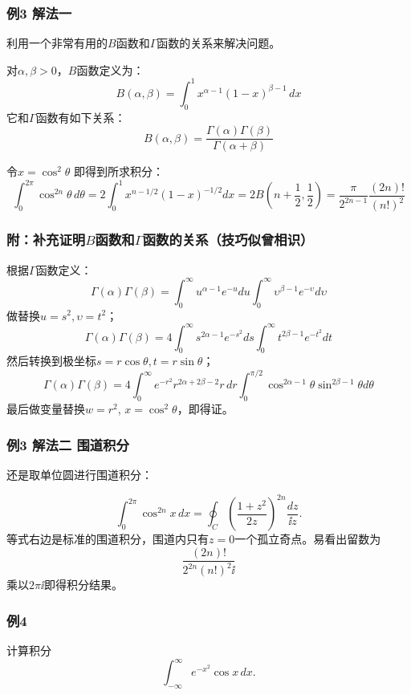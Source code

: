 \documentclass[CJK]{beamer}
\begin{document}
\begin{frame}
  \frametitle{例3 解法一}
  
  利用一个非常有用的{\blue $B$函数和$\Gamma$函数的关系}来解决问题。

  \skipline
  
  对$\alpha, \beta>0$，$B$函数定义为：
  $$B(\alpha,\beta) = \int_0^1 x^{\alpha-1}(1-x)^{\beta-1}\, dx$$
  它和$\Gamma$函数有如下关系：
  {\blue $$B(\alpha,\beta) = \frac{\Gamma(\alpha)\Gamma(\beta)}{\Gamma(\alpha+\beta)} $$}

  令$x=\cos^2\theta$ 即得到所求积分：
 {\small $$\int_0^{2\pi}\cos^{2n}\theta \,d\theta = 2 \int_0^1x^{n-1/2}(1-x)^{-1/2} dx =2 B(n+\frac{1}{2},\frac{1}{2}) = \frac{\pi}{2^{2n-1}}\frac{(2n)!}{(n!)^2} $$}
  
  
\end{frame}


\begin{frame}
  \frametitle{附：补充证明$B$函数和$\Gamma$函数的关系（技巧似曾相识）}
  
  根据$\Gamma$函数定义：
  $$  \Gamma(\alpha)\Gamma(\beta) = \int_0^\infty u^{\alpha-1}e^{-u} du \int_0^\infty \upsilon^{\beta-1}e^{-\upsilon} d\upsilon    $$
  做替换$u=s^2, \upsilon = t^2$；
  $$  \Gamma(\alpha)\Gamma(\beta) = 4 \int_0^\infty s^{2\alpha-1}e^{-s^2} ds \int_0^\infty t^{2\beta-1}e^{-t^2} dt $$
  然后转换到极坐标$s = r\cos\theta, t = r\sin\theta$；
  $$ \Gamma(\alpha)\Gamma(\beta) = 4 \int_0^\infty  e^{-r^2}r^{2\alpha+2\beta-2}r\,dr \int_0^{\pi/2}\cos^{2\alpha-1}\theta \sin^{2\beta-1}\theta d\theta $$
  最后做变量替换$w = r^2$, $x = \cos^2\theta$，即得证。

  
\end{frame}

\begin{frame}
  \frametitle{例3 解法二 围道积分}
  
  还是取单位圆进行围道积分：


  
  $$ \int_0^{2\pi}\cos^{2n}x \, dx = \oint_C \left(\frac{1+z^2}{2z}\right)^{2n}\frac{dz}{\ii z}.$$
  等式右边是标准的围道积分，围道内只有$z=0$一个孤立奇点。易看出留数为
  $$\frac{(2n)!}{2^{2n}(n!)^2\ii}$$
  乘以$2\pi\ii$即得积分结果。
  
\end{frame}



\begin{frame}
  \frametitle{例4}
  

  计算积分$$ \int_{-\infty}^\infty e^{-x^2}\cos x \, dx .$$

  
  
\end{frame}
\end{document}
